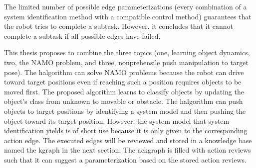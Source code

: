 The limited number of possible edge parameterizations (every combination of a system identification method with a compatible control method) guarantees that the robot tries to complete a subtask. However, it concludes that it cannot complete a subtask if all possible edges have failed.\bs

This thesis proposes to combine the three topics (one, learning object dynamics, two, the \ac{NAMO} problem, and three, nonprehensile push manipulation to target pose). The \ac{halgorithm} can solve \ac{NAMO} problems because the robot can drive toward target positions even if reaching such a position requires objects to be moved first. The proposed algorithm learns to classify objects by updating the object's class from unknown to movable or obstacle. The \ac{halgorithm} can push objects to target positions by identifying a system model and then pushing the object toward its target position. However, the system model that system identification yields is of short use because it is only given to the corresponding action edge. The executed edges will be reviewed and stored in a knowledge base named the \acf{kgraph} in the next section. The ac{kgraph} is filled with action reviews such that it can suggest a parameterization based on the stored action reviews.\bs

